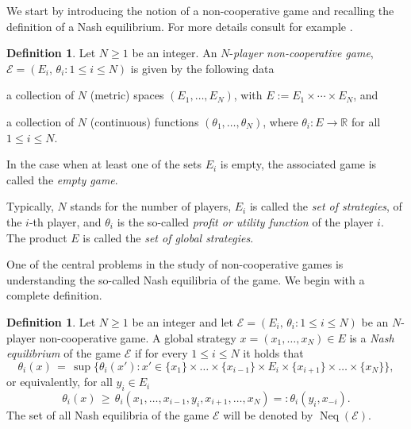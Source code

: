 \documentclass[a4paper,11pt,reqno,english]{amsart}
\theoremstyle{plain}
\theoremstyle{definition}
\newtheorem{definition}[theorem]{Definition}
\newcommand\R{\mathbb{R}}
\newcommand{\Ecal}{\mathcal{E}}
\DeclareMathOperator{\NashEquilibria}{Neq}
\begin{document}
We start by introducing the notion of a non-cooperative game and recalling the definition of a Nash equilibrium.
For more details consult for example \cite[Sec.\,4.1]{Ichiishi_1983}.

\begin{definition}\label{def:game_in_normal_form}
	Let $N\geq 1$ be an integer.
	An $N$-\textit{player non-cooperative game}, $\Ecal=(E_i,\,\theta_i : 1\leq i\leq N)$ is given by the following data
	\begin{compactitem}[\quad --]
		\item a collection of $N$ (metric) spaces $(E_1,\dots,E_N)$, with $E:=E_1\times \cdots\times E_N$, and
		\item a collection of $N$ (continuous) functions $(\theta_1,\dots,\theta_N)$, where $\theta_i\colon E\longrightarrow \R$ for all $1\leq i\leq N$.
	\end{compactitem}
	In the case when at least one of the sets $E_i$ is empty, the associated game is called the {\em empty game}.
\end{definition}

Typically, $N$ stands for the number of players, $E_i$ is called the {\em set of strategies}, of the $i$-th player, and $\theta_i$ is the so-called {\em profit or utility function} of the player $i$.
The product $E$ is called the \textit{set of global strategies}.

\medskip
One of the central problems in the study of non-cooperative games is understanding the so-called Nash equilibria of the game. We begin with a complete definition.


\begin{definition}
	\label{def:NashEquilibrium}
	Let $N\geq 1$ be an integer and let $\Ecal=(E_i,\,\theta_i : 1\leq i\leq N)$ be an $N$-player non-cooperative game.
	A global strategy $x=(x_1,\dots,x_N)\in E$ is a {\em Nash equilibrium} of the game $\Ecal$ if for every $1\leq i\leq N$ it holds that
	\begin{displaymath}
		\theta_i(x) \,= \, \sup\big\{ \theta_i(x') : x'\in \{x_1\}\times \dots\times \{x_{i-1}\}\times E_i\times \{x_{i+1}\}\times \dots\times \{x_N\}\big\},
	\end{displaymath}
	or equivalently, for all $y_i\in E_i$
	\begin{displaymath}
		\theta_i(x) \, \geq \, \theta_i(x_1,\dots,x_{i-1},y_i,x_{i+1},\dots,x_N) =: \theta_i(y_i, x_{-i}).
	\end{displaymath}
	The set of all Nash equilibria of the game $\Ecal$ will be denoted by $\NashEquilibria(\Ecal)$.
\end{definition}
\end{document}
